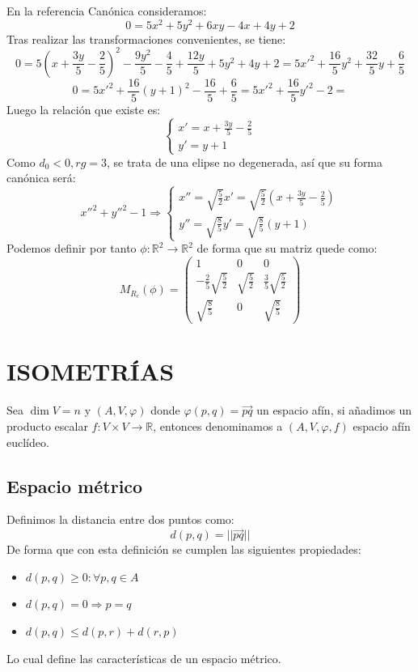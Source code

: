 \documentclass[10pt,a4paper,openright]{book}
\theoremstyle{break}
\begin{document}
En la referencia Canónica consideramos:
$$0 = 5x^2 + 5y^2 + 6xy - 4x + 4y + 2$$
Tras realizar las transformaciones convenientes, se tiene:
$$0 =5 (x + \frac{3y}{5} - \frac{2}{5})^2 - \frac{9y^2}{5} - \frac{4}{5} + \frac{12y}{5} + 5y^2 + 4y + 2 = 5x'^2 + \frac{16}{5} y^2 + \frac{32}{5} y + \frac{6}{5}$$
$$0 = 5x'^2 + \frac{16}{5} (y + 1)^2 - \frac{16}{5} + \frac{6}{5} = 5x'^2 + \frac{16}{5} y'^2 - 2 = $$
Luego la relación que existe es:
$$\begin{cases} x' = x + \frac{3y}{5} - \frac{2}{5} \\ y' = y + 1 \end{cases}$$
Como $ d_0 < 0, rg = 3$, se trata de una elipse no degenerada, así que su forma canónica será:
$$x''^2 + y''^2 - 1 \Rightarrow \begin{cases} x'' = \sqrt{\frac{5}{2}} x' =  \sqrt{\frac{5}{2}} (x + \frac{3y}{5} - \frac{2}{5})  \\ y'' = \sqrt{\frac{8}{5}} y' = \sqrt{\frac{8}{5}} (y+1)\end{cases}$$
Podemos definir por tanto $\phi : \mathbb{R}^2 \to  \mathbb{R}^2$ de forma que su matriz quede como:
$$M_{R_c} (\phi)= \left(\begin{array}{c|cc}
1 & 0 & 0 \\
\hline
- \frac{2}{5}\sqrt{\frac{5}{2}}  & \sqrt{\frac{5}{2}}  & \frac{3}{5}\sqrt{\frac{5}{2}}  \\
\sqrt{\frac{8}{5}} &  0 & \sqrt{\frac{8}{5}}
\end{array}
\right) $$

\newpage
\section*{ISOMETRÍAS}
Sea $\dim V = n$ y $(A, V, \varphi)$ donde $\varphi(p,q) = \vec{pq}$ un espacio afín, si añadimos un producto escalar $f: V \times V \rightarrow \mathbb R$, entonces denominamos a $(A,V,\varphi, f)$ espacio afín euclídeo.

\subsection{Espacio métrico}
Definimos la distancia entre dos puntos como:
$$d(p,q) = ||\vec{pq}||$$
De forma que con esta definición se cumplen las siguientes propiedades:
\begin{itemize}
\item $d(p,q) \geq 0 : \forall p,q\in A$
\item $d(p,q) = 0\Rightarrow p = q$
\item $d(p,q) \leq d(p,r) + d(r,p)$
\end{itemize}
Lo cual define las características de un espacio métrico.
\end{document}
